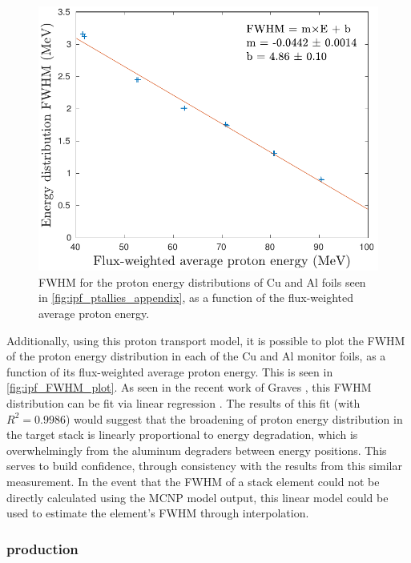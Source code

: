 \begin{figure}
 \centering
 \includegraphics[width=0.5\columnwidth]{./figures/FWHM_plot.pdf}
 \caption{FWHM for the proton energy distributions of Cu and Al foils seen in \autoref{fig:ipf_ptallies_appendix}, as a function of the flux-weighted average proton energy. }
 \label{fig:ipf_FWHM_plot}
\end{figure}



Additionally, using this proton transport model, it is possible to plot the FWHM of the proton energy distribution in each of the Cu and Al monitor foils, as a function of its  flux-weighted average proton energy.
This is seen in \autoref{fig:ipf_FWHM_plot}.
As seen in the recent work of Graves \etal, this FWHM distribution can be fit via linear regression \cite{Graves2016}.
The results of this fit (with $R^2=0.9986$) would suggest that the broadening of proton energy distribution in the target stack is linearly proportional to energy degradation, which is overwhelmingly from the aluminum degraders between energy positions.
This serves to build confidence, through consistency with the  results from this similar measurement.
In the event that the FWHM of a stack element could not be directly calculated using the MCNP model output, this linear model could be used to estimate the element's FWHM through interpolation. 




\subsubsection{ production}

